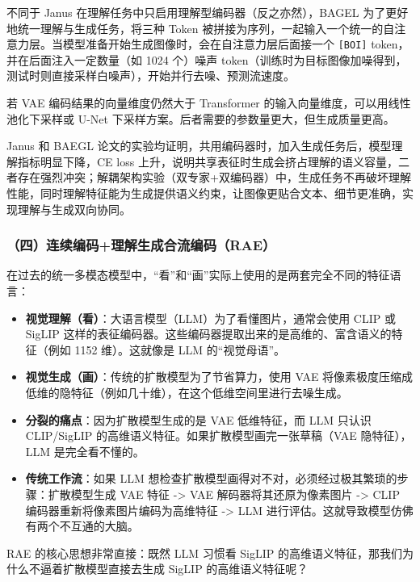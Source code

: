 不同于 Janus 在理解任务中只启用理解型编码器（反之亦然），BAGEL 为了更好地统一理解与生成任务，将三种 Token 被拼接为序列，一起输入一个统一的自注意力层。当模型准备开始生成图像时，会在自注意力层后面接一个 \texttt{{[}BOI{]}} token，并在后面注入一定数量（如 1024 个）噪声 token（训练时为目标图像加噪得到，测试时则直接采样白噪声），开始并行去噪、预测流速度。

若 VAE 编码结果的向量维度仍然大于 Transformer 的输入向量维度，可以用线性池化下采样或 U-Net 下采样方案。后者需要的参数量更大，但生成质量更高。

Janus 和 BAEGL 论文的实验均证明，共用编码器时，加入生成任务后，模型理解指标明显下降，CE loss 上升，说明共享表征时生成会挤占理解的语义容量，二者存在强烈冲突；解耦架构实验（双专家+双编码器）中，生成任务不再破坏理解性能，同时理解特征能为生成提供语义约束，让图像更贴合文本、细节更准确，实现理解与生成双向协同。

\hypertarget{ux56dbux8fdeux7eedux7f16ux7801ux7406ux89e3ux751fux6210ux5408ux6d41ux7f16ux7801rae}{%
\subsubsection{（四）连续编码+理解生成合流编码（RAE）}\label{ux56dbux8fdeux7eedux7f16ux7801ux7406ux89e3ux751fux6210ux5408ux6d41ux7f16ux7801rae}}

在过去的统一多模态模型中，``看''和``画''实际上使用的是两套完全不同的特征语言：

\begin{itemize}
\item
  \textbf{视觉理解（看）}：大语言模型（LLM）为了看懂图片，通常会使用 CLIP 或 SigLIP 这样的表征编码器。这些编码器提取出来的是高维的、富含语义的特征（例如 1152 维）。这就像是 LLM 的``视觉母语''。
\item
  \textbf{视觉生成（画）}：传统的扩散模型为了节省算力，使用 VAE 将像素极度压缩成低维的隐特征（例如几十维），在这个低维空间里进行去噪生成。
\item
  \textbf{分裂的痛点}：因为扩散模型生成的是 VAE 低维特征，而 LLM 只认识 CLIP/SigLIP 的高维语义特征。如果扩散模型画完一张草稿（VAE 隐特征），LLM 是完全看不懂的。
\item
  \textbf{传统工作流}：如果 LLM 想检查扩散模型画得对不对，必须经过极其繁琐的步骤：扩散模型生成 VAE 特征 -\textgreater{} VAE 解码器将其还原为像素图片 -\textgreater{} CLIP 编码器重新将像素图片编码为高维特征 -\textgreater{} LLM 进行评估。这就导致模型仿佛有两个不互通的大脑。
\end{itemize}

RAE 的核心思想非常直接：既然 LLM 习惯看 SigLIP 的高维语义特征，那我们为什么不逼着扩散模型直接去生成 SigLIP 的高维语义特征呢？

